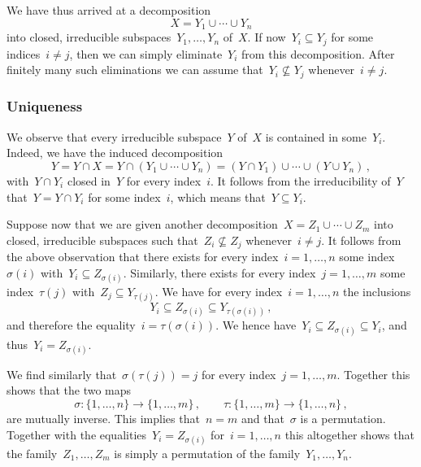 We have thus arrived at a decomposition
\[
	X = Y_1 ∪ \dotsb ∪ Y_n
\]
into closed, irreducible subspaces~$Y_1, \dotsc, Y_n$ of~$X$.
If now~$Y_i ⊆ Y_j$ for some indices~$i ≠ j$, then we can simply eliminate~$Y_i$ from this decomposition.
After finitely many such eliminations we can assume that~$Y_i ⊈ Y_j$ whenever~$i ≠ j$.



\subsubsection*{Uniqueness}

We observe that every irreducible subspace~$Y$ of~$X$ is contained in some~$Y_i$.
Indeed, we have the induced decomposition
\[
	Y
	=
	Y ∩ X
	=
	Y ∩ (Y_1 ∪ \dotsb ∪ Y_n)
	=
	(Y ∩ Y_1) ∪ \dotsb ∪ (Y ∪ Y_n) \,,
\]
with~$Y ∩ Y_i$ closed in~$Y$ for every index~$i$.
It follows from the irreducibility of~$Y$ that~$Y = Y ∩ Y_i$ for some index~$i$, which means that~$Y ⊆ Y_i$.

Suppose now that we are given another decomposition~$X = Z_1 ∪ \dotsb ∪ Z_m$ into closed, irreducible subspaces such that~$Z_i ⊈ Z_j$ whenever~$i ≠ j$.
It follows from the above observation that there exists for every index~$i = 1, \dotsc, n$ some index~$σ(i)$ with~$Y_i ⊆ Z_{σ(i)}$.
Similarly, there exists for every index~$j = 1, \dotsc, m$ some index~$τ(j)$ with~$Z_j ⊆ Y_{τ(j)}$.
We have for every index~$i = 1, \dotsc, n$ the inclusions
\begin{equation}
	\label{nesting of irreducible components}
	Y_i ⊆ Z_{σ(i)} ⊆ Y_{τ(σ(i))} \,,
\end{equation}
and therefore the equality~$i = τ(σ(i))$.
We hence have~$Y_i ⊆ Z_{σ(i)} ⊆ Y_i$, and thus~$Y_i = Z_{σ(i)}$.

We find similarly that~$σ(τ(j)) = j$ for every index~$j = 1, \dotsc, m$.
Together this shows that the two maps
\[
	σ \colon \{ 1, \dotsc, n \} \to \{ 1, \dotsc, m \}\,,
	\qquad
	τ \colon \{ 1, \dotsc, m \} \to \{ 1, \dotsc, n \}\,,
\]
are mutually inverse.
This implies that~$n = m$ and that~$σ$ is a permutation.
Together with the equalities~$Y_i = Z_{σ(i)}$ for~$i = 1, \dotsc, n$ this altogether shows that the family~$Z_1, \dotsc, Z_m$ is simply a permutation of the family~$Y_1, \dotsc, Y_n$.
